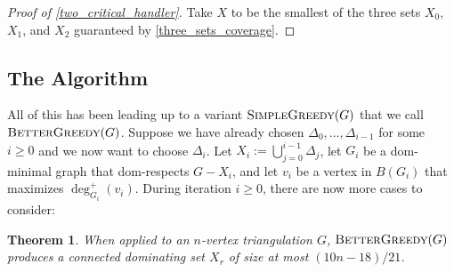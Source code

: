 \documentclass{article}
\newtheorem{thm}{Theorem}
\theoremstyle{definition}
\begin{document}
\begin{proof}[Proof of \cref{two_critical_handler}]
  Take $X$ to be the smallest of the three sets $X_0$, $X_1$, and $X_2$ guaranteed by \cref{three_sets_coverage}.
\end{proof}


\subsection{The Algorithm}


All of this has been leading up to a variant  $\textsc{SimpleGreedy}(G)$ that we call $\textsc{BetterGreedy}(G)$.  Suppose we have already chosen $\Delta_0,\ldots,\Delta_{i-1}$ for some $i\ge 0$ and we now want to choose $\Delta_i$.  Let $X_i:=\bigcup_{j=0}^{i-1}\Delta_j$, let $G_i$ be a dom-minimal graph that dom-respects $G-X_i$, and let $v_i$ be a vertex in $B(G_i)$ that maximizes $\deg^+_{G_i}(v_i)$.  During iteration $i\ge 0$, there are now more cases to consider:

\begin{thm}\label{better_greedy}
  When applied to an $n$-vertex triangulation $G$,  $\textsc{BetterGreedy}(G)$ produces a connected dominating set $X_r$ of size at most $(10n-18)/21$.
\end{thm}
\end{document}
